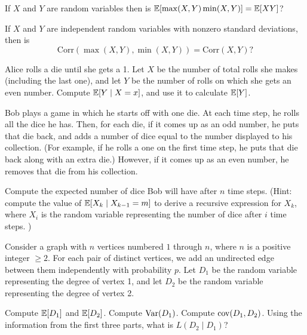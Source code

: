 \documentclass[11pt]{article}
\begin{document}
\begin{Parts}[resume]
	\Part If $X$ and $Y$ are random variables then is $\operatorname{\mathbb{E}}[\max (X, Y) \min (X, Y)] = \operatorname{\mathbb{E}}[X Y]$?
	

	\Part If $X$ and $Y$ are independent random variables with nonzero standard deviations, then is $$\text{Corr} (\max (X, Y), \min (X, Y)) = \text{Corr} (X, Y) ?$$
	
\end{Parts}


\begin{Parts}

\Part Alice rolls a die until she gets a 1. Let $X$ be the number of total rolls she makes (including the last one), and let $Y$ be the number of rolls on which she gets an even number. Compute $\operatorname{\mathbb{E}}[Y \mid X = x]$, and use it to calculate $\operatorname{\mathbb{E}}[Y]$. 

\Part Bob plays a game in which he starts off with one die. At each time step, he rolls all the dice he has. Then, for each die, if it comes up as an odd number, he puts that die back, and adds a number of dice equal to the number displayed to his collection. (For example, if he rolls a one on the first time step, he puts that die back along with an extra die.) However, if it comes up as an even number, he removes that die from his collection.

Compute the expected number of dice Bob will have after $n$ time steps. (Hint: compute the value of $\operatorname{\mathbb{E}}[X_k \mid X_{k-1} = m]$ to derive a recursive expression for $X_k$, where $X_i$ is the random variable representing the number of dice after $i$ time steps. )
\end{Parts}

Consider a graph with $n$ vertices numbered $1$ through $n$, where $n$ is a positive integer $\ge 2$. For each pair of distinct vertices, we add an undirected edge between them independently with probability $p$. Let $D_1$ be the random variable representing the degree of vertex 1, and let $D_2$ be the random variable representing the degree of vertex 2. 

\begin{Parts}
	\Part Compute $\operatorname{\mathbb{E}}[D_1]$ and $\operatorname{\mathbb{E}}[D_2]$.
	\Part Compute $\operatorname{Var}(D_1)$. 
	\Part Compute $\operatorname{cov}(D_1, D_2)$.
    \Part Using the information from the first three parts, what is $L(D_2 \mid D_1)$?
\end{Parts}
\end{document}
